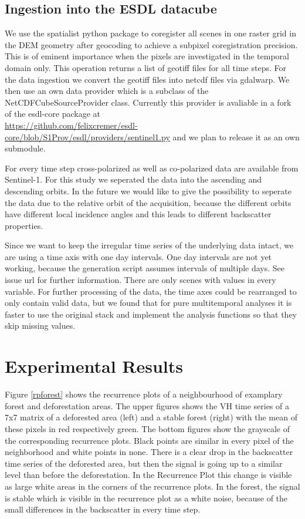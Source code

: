 \documentclass{article}
\begin{document}
\subsection{Ingestion into the ESDL datacube}
We use the spatialist python package \cite{spatialist} to coregister all scenes
in one raster grid in the DEM geometry after geocoding to achieve a subpixel coregistration precision.
This is of eminent importance when the pixels are investigated in the temporal domain only.
This operation returns a list of geotiff files for all time steps.
For the data ingestion we convert the geotiff files into netcdf files via gdalwarp.
We then use an own data provider which is a subclass of the NetCDFCubeSourceProvider class.
Currently this provider is avaliable in a fork of the esdl-core package at \\
\url{https://github.com/felixcremer/esdl-core/blob/S1Prov/esdl/providers/sentinel1.py}
and we plan to release it as an own submodule.

For every time step cross-polarized as well as co-polarized data are available from Sentinel-1.
For this study we seperated the data into the ascending and descending orbits.
In the future we would like to give the possibility to seperate the data due to the relative orbit of the acquisition,
because the different orbits have different local incidence angles and this leads to different backscatter properties.

Since we want to keep the irregular time series of the underlying data intact, we are using a time axis with one day intervals.
One day intervals are not yet working, because the generation script assumes intervals of multiple days.
See issue url for further information.
There are only scenes with values in every variable.
For further processing of the data, the time axes could be rearranged to only contain valid data,
but we found that for pure multitemporal analyses it is faster to use the original stack and implement the analysis functions so that they skip missing values. 




\section{Experimental Results}

Figure \ref{rpforest} shows the recurrence plots of a neighbourhood of examplary forest and deforestation areas.
The upper figures shows the VH time series of a 7x7 matrix of a deforested area (left) and a stable forest (right) with the mean of these pixels in red respectively green.
The bottom figures show the grayscale of the corresponding recurrence plots.
Black points are similar in every pixel of the neighborhood and white points in none.
There is a clear drop in the backscatter time series of the deforested area, but then the signal is going up to a similar level than before the deforestation.
In the Recurrence Plot this change is visible as large white areas in the corners of the recurrence plots. 
In the forest, the signal is stable which is visible in the recurrence plot as a white noise, because of the small differences in the backscatter in every time step.
\end{document}
